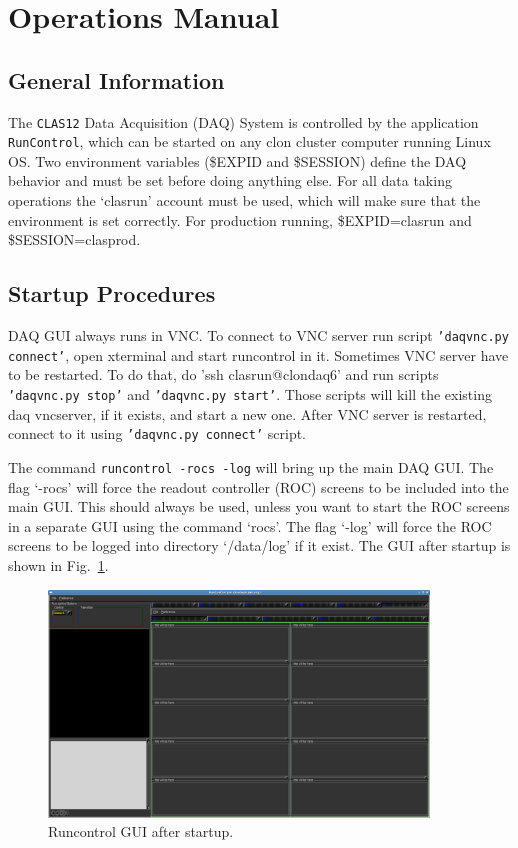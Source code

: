 \section{Operations Manual}

\subsection{General Information}

The {\tt CLAS12} Data Acquisition (DAQ) System is controlled by the application 
{\tt RunControl}, which can be started on any clon cluster computer running
Linux OS. Two environment variables (\$EXPID and \$SESSION) define the DAQ behavior 
and must be set before doing anything else. For all data taking operations the
`clasrun' account must be used, which will make sure that the environment is 
set correctly. For production running, \$EXPID=clasrun and \$SESSION=clasprod.

\subsection{Startup Procedures}

DAQ GUI always runs in VNC. To connect to VNC server run script {\tt'daqvnc.py connect'},
open xterminal and start runcontrol in it. Sometimes VNC server have
to be restarted. To do that, do 'ssh clasrun@clondaq6' and run scripts
{\tt'daqvnc.py stop'} and {\tt'daqvnc.py start'}. Those scripts will kill the existing
daq vncserver, if it exists, and start a new one. After VNC server is restarted, connect
to it using {\tt'daqvnc.py connect'} script.

The command {\tt runcontrol -rocs -log} will bring up the main DAQ GUI. The flag
`-rocs' will force the readout controller (ROC) screens to be included into 
the main GUI. This should always be used, unless you want to start the ROC 
screens in a separate GUI using the command `rocs'. The flag `-log'
will force the ROC screens to be logged into directory `/data/log' if
it exist. The GUI after startup is shown in Fig.~\ref{fig:runcontrol1}.

\begin{figure}[ht]
\centering
\includegraphics[width=0.9\textwidth]{runcontrol1.png}
\caption{\small{Runcontrol GUI after startup.}}
\label{fig:runcontrol1} 
\end{figure}

